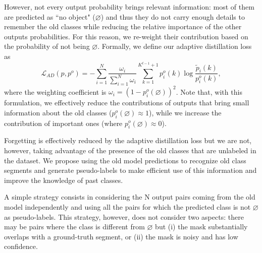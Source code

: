 \documentclass[10pt,twocolumn,letterpaper]{article}
\begin{document}
However, not every output probability brings relevant information: most of them are predicted as “no object" ($\varnothing$) and thus they do not carry enough details to remember the old classes while reducing the relative importance of the other outputs probabilities. 
For this reason, we re-weight their contribution based on the probability of not being $\varnothing$. Formally, we define our adaptive distillation loss as
\begin{equation}  \label{eq:qd}
    \mathcal{L}_{AD}(p, p^o) = - \sum_{i=1}^{N} \frac{\omega_i}{\sum_{i=1}^{N} \omega_i} \sum_{k=1}^{K^{t-1}+1} p_i^o(k) \log \frac{\tilde{p}_i(k)}{p_i^o(k)},
\end{equation}
where the weighting coefficient is $\omega_i = (1-p_i^o(\varnothing))^2$. 
Note that, with this formulation, we effectively reduce the contributions of outputs that bring small information about the old classes ($p_i^o(\varnothing) \approx 1$), while we increase the contribution of important ones (where $p_i^o(\varnothing) \approx 0$). 

Forgetting is effectively reduced by the adaptive distillation loss but we are not, however, taking advantage of the presence of the old classes that are unlabeled in the dataset. We propose using the old model predictions to recognize old class segments and generate pseudo-labels to make efficient use of this information and improve the knowledge of past classes.

A simple strategy consists in considering the N output pairs coming from the old model independently and using all the pairs for which the predicted class is not $\varnothing$ as pseudo-labels. This strategy, however, does not consider two aspects: there may be pairs where the class is different from $\varnothing$ but (i) the mask substantially overlaps with a ground-truth segment, or (ii) the mask is noisy and has low confidence.
\end{document}
